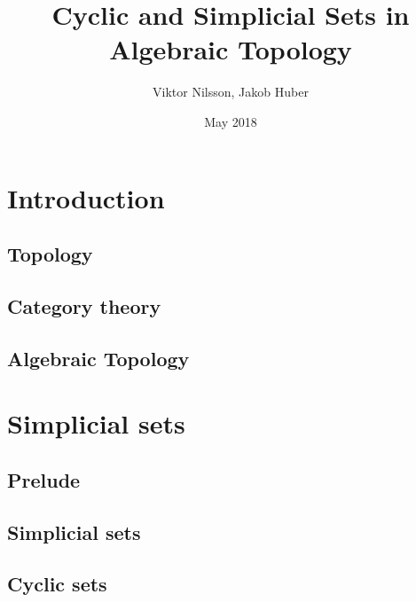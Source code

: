 \documentclass{report}
\title{Cyclic and Simplicial Sets in Algebraic Topology}
\author{Viktor Nilsson, Jakob Huber}
\date{May 2018}
\theoremstyle{definition}
\begin{document}
    \maketitle
    
    \begin{abstract}
        
    \end{abstract}
    
    \tableofcontents
    
    \chapter{Introduction}
        
        
        \section{Topology}
            
        \section{Category theory}
            
        \section{Algebraic Topology}
            
    
    \chapter{Simplicial sets}
        \section{Prelude}
            
        \section{Simplicial sets}
            
        \section{Cyclic sets}
            
    
    \printbibliography
\end{document}
